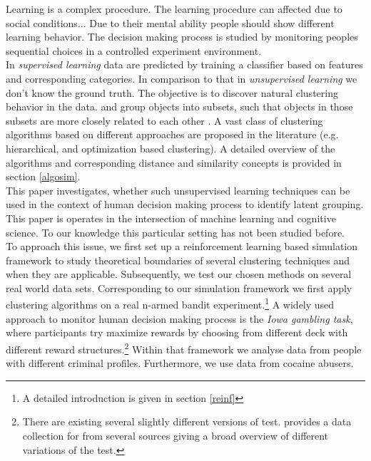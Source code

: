 \documentclass[12pt,a4paper,bibliography=totocnumbered,listof=totocnumbered]{scrartcl}
\begin{document}
Learning is a complex procedure. The learning procedure can affected due to social conditions... Due to their mental ability people should show different learning behavior. The decision making process is studied by monitoring peoples sequential choices in a controlled experiment environment.\\
In \textit{supervised learning} data are predicted by training a classifier based on features and corresponding categories. In comparison to that in \textit{unsupervised learning} we don't know the ground truth. The objective is to discover natural clustering behavior in the data. \cite[page 9 et. seqq.]{Murphy2012} and group objects into subsets, such that objects in those subsets are more closely related to each other \cite[page 501]{hastie}. A vast class of clustering algorithms based on different approaches are proposed in the literature (e.g. hierarchical, and optimization based clustering). A detailed overview of the algorithms and corresponding distance and similarity concepts is provided in section \ref{algosim}.\\
This paper investigates, whether such unsupervised learning techniques can be used in the context of human decision making process to identify latent grouping. This paper is operates in the intersection of machine learning and cognitive science. To our knowledge this particular setting has not been studied before.\\ 
To approach this issue, we first set up a reinforcement learning based simulation framework to study theoretical boundaries of several clustering techniques and when they are applicable. Subsequently, we test our chosen methods on several  real world data sets. Corresponding to our simulation framework we first apply clustering algorithms on a real n-armed bandit experiment.\footnote{A detailed introduction is given in section \ref{reinf}} A widely used approach to monitor human decision making process is the \textit{Iowa gambling task}, where participants try maximize rewards by choosing from different deck with different reward structures.\footnote{There are existing several slightly different versions of test. \cite{Steingroever2015} provides a data collection for from several sources giving a broad overview of different variations of the test.} Within that framework we analyse  data from people with different criminal profiles. Furthermore, we use data from cocaine abusers.\\
\end{document}
